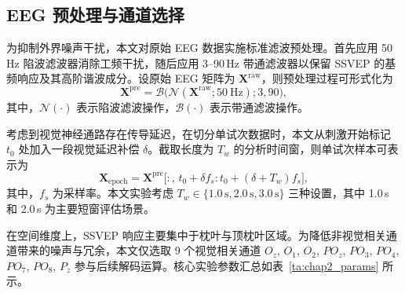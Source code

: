 


\subsection{EEG 预处理与通道选择}
\label{subsec:chap2_preprocess_channel}

为抑制外界噪声干扰，本文对原始 EEG 数据实施标准滤波预处理。首先应用 50\,Hz 陷波滤波器消除工频干扰，随后应用 3--90\,Hz 带通滤波器以保留 SSVEP 的基频响应及其高阶谐波成分。设原始 EEG 矩阵为 $\mathbf{X}^{\mathrm{raw}}$，则预处理过程可形式化为
\begin{equation}
\mathbf{X}^{\mathrm{pre}}
=
\mathcal{B}\bigl(\mathcal{N}(\mathbf{X}^{\mathrm{raw}};50\ \mathrm{Hz});3,90\bigr),
\label{eq:chap2_preprocess}
\end{equation}
其中，$\mathcal{N}(\cdot)$ 表示陷波滤波操作，$\mathcal{B}(\cdot)$ 表示带通滤波操作。

考虑到视觉神经通路存在传导延迟，在切分单试次数据时，本文从刺激开始标记 $t_0$ 处加入一段视觉延迟补偿 $\delta$。截取长度为 $T_w$ 的分析时间窗，则单试次样本可表示为
\begin{equation}
\mathbf{X}_{\mathrm{epoch}}
=
\mathbf{X}^{\mathrm{pre}}
\bigl[:,\, t_0+\delta f_s : t_0+(\delta+T_w)f_s \bigr],
\label{eq:chap2_epoch}
\end{equation}
其中，$f_s$ 为采样率。本文实验考虑 $T_w\in\{1.0\,\mathrm{s},2.0\,\mathrm{s},3.0\,\mathrm{s}\}$ 三种设置，其中 1.0\,s 和 2.0\,s 为主要短窗评估场景。

在空间维度上，SSVEP 响应主要集中于枕叶与顶枕叶区域。为降低非视觉相关通道带来的噪声与冗余，本文仅选取 9 个视觉相关通道 $O_z$, $O_1$, $O_2$, $PO_z$, $PO_3$, $PO_4$, $PO_7$, $PO_8$, $P_z$ 参与后续解码运算。核心实验参数汇总如表~\ref{ta:chap2_params} 所示。

